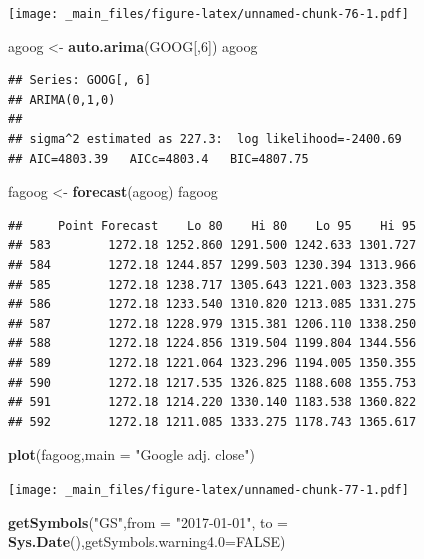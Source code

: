 \documentclass[]{book}
\newenvironment{Shaded}{\begin{snugshade}}{\end{snugshade}}
\newcommand{\DataTypeTok}[1]{\textcolor[rgb]{0.13,0.29,0.53}{#1}}
\newcommand{\DecValTok}[1]{\textcolor[rgb]{0.00,0.00,0.81}{#1}}
\newcommand{\KeywordTok}[1]{\textcolor[rgb]{0.13,0.29,0.53}{\textbf{#1}}}
\newcommand{\NormalTok}[1]{#1}
\newcommand{\OtherTok}[1]{\textcolor[rgb]{0.56,0.35,0.01}{#1}}
\newcommand{\StringTok}[1]{\textcolor[rgb]{0.31,0.60,0.02}{#1}}
\begin{document}
\texttt{[image: \_main\_files/figure-latex/unnamed-chunk-76-1.pdf]}

\begin{Shaded}
\begin{Highlighting}[]
\NormalTok{agoog <-}\StringTok{ }\KeywordTok{auto.arima}\NormalTok{(GOOG[,}\DecValTok{6}\NormalTok{])}
\NormalTok{agoog}
\end{Highlighting}
\end{Shaded}

\begin{verbatim}
## Series: GOOG[, 6] 
## ARIMA(0,1,0) 
## 
## sigma^2 estimated as 227.3:  log likelihood=-2400.69
## AIC=4803.39   AICc=4803.4   BIC=4807.75
\end{verbatim}

\begin{Shaded}
\begin{Highlighting}[]
\NormalTok{fagoog <-}\StringTok{ }\KeywordTok{forecast}\NormalTok{(agoog)}
\NormalTok{fagoog}
\end{Highlighting}
\end{Shaded}

\begin{verbatim}
##     Point Forecast    Lo 80    Hi 80    Lo 95    Hi 95
## 583        1272.18 1252.860 1291.500 1242.633 1301.727
## 584        1272.18 1244.857 1299.503 1230.394 1313.966
## 585        1272.18 1238.717 1305.643 1221.003 1323.358
## 586        1272.18 1233.540 1310.820 1213.085 1331.275
## 587        1272.18 1228.979 1315.381 1206.110 1338.250
## 588        1272.18 1224.856 1319.504 1199.804 1344.556
## 589        1272.18 1221.064 1323.296 1194.005 1350.355
## 590        1272.18 1217.535 1326.825 1188.608 1355.753
## 591        1272.18 1214.220 1330.140 1183.538 1360.822
## 592        1272.18 1211.085 1333.275 1178.743 1365.617
\end{verbatim}

\begin{Shaded}
\begin{Highlighting}[]
\KeywordTok{plot}\NormalTok{(fagoog,}\DataTypeTok{main =} \StringTok{"Google adj. close"}\NormalTok{)}
\end{Highlighting}
\end{Shaded}

\texttt{[image: \_main\_files/figure-latex/unnamed-chunk-77-1.pdf]}

\begin{Shaded}
\begin{Highlighting}[]
\KeywordTok{getSymbols}\NormalTok{(}\StringTok{"GS"}\NormalTok{,}\DataTypeTok{from =} \StringTok{"2017-01-01"}\NormalTok{, }\DataTypeTok{to =} \KeywordTok{Sys.Date}\NormalTok{(),}\DataTypeTok{getSymbols.warning4.0=}\OtherTok{FALSE}\NormalTok{)}
\end{Highlighting}
\end{Shaded}
\end{document}
